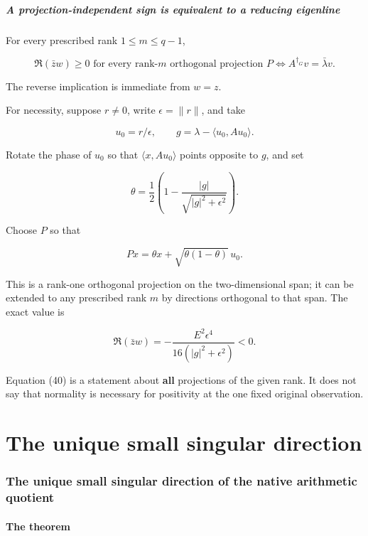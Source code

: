 \documentclass[11pt]{article}
\begin{document}
\subsubsection{A projection-independent sign is equivalent to a reducing eigenline}\label{a-projection-independent-sign-is-equivalent-to-a-reducing-eigenline}

For every prescribed rank \(1\le m\le q-1\),

\[
\boxed{
\Re(\bar zw)\ge0
\text{ for every rank-}m\text{ orthogonal projection }P
\iff
A^{\dagger_G}v=\bar\lambda v.
}
\tag{40}
\]

The reverse implication is immediate from \(w=z\).

For necessity, suppose \(r\ne0\), write \(\epsilon=\|r\|\), and take

\[
u_0=r/\epsilon,\qquad g=\lambda-\langle u_0,Au_0\rangle.
\]

Rotate the phase of \(u_0\) so that \(\langle x,Au_0\rangle\) points opposite to \(g\), and set

\[
\theta=
\frac12\left(
1-\frac{|g|}{\sqrt{|g|^2+\epsilon^2}}
\right).
\]

Choose \(P\) so that

\[
Px=\theta x+\sqrt{\theta(1-\theta)}\,u_0.
\]

This is a rank-one orthogonal projection on the two-dimensional span; it can be extended to any prescribed rank \(m\) by directions orthogonal to that span. The exact value is

\[
\boxed{
\Re(\bar zw)
=
-\frac{E^2\epsilon^4}{16(|g|^2+\epsilon^2)}<0.
}
\tag{41}
\]

Equation (40) is a statement about \textbf{all} projections of the given rank. It does not say that normality is necessary for positivity at the one fixed original observation.

\clearpage\part{The unique small singular direction}
\label{part:7}
\section{The unique small singular direction of the native arithmetic quotient}\label{the-unique-small-singular-direction-of-the-native-arithmetic-quotient}

\subsection{The theorem}\label{the-theorem}
\end{document}
